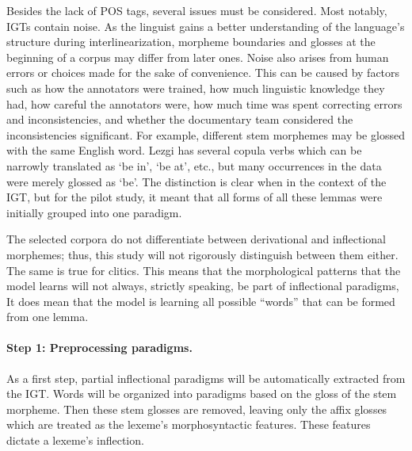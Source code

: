 Besides the lack of POS tags, several issues must be considered. Most notably, IGTs contain noise. 
As the linguist gains a better understanding of the language's structure during interlinearization, morpheme boundaries and glosses at the beginning of a corpus may differ from later ones. 
Noise also arises from human errors or choices made for the sake of convenience. This can be caused by factors such as how the annotators were trained, how much linguistic knowledge they had, how careful the annotators were, how much time was spent correcting errors and inconsistencies, and whether the documentary team considered the inconsistencies significant.
For example, different stem morphemes may be glossed with the same English word. Lezgi has several copula verbs which can be narrowly translated as `be in', `be at', etc., but many occurrences in the data were merely glossed as `be'. The distinction is clear when in the context of the IGT, but for the pilot study, it meant that all forms of all these lemmas were initially grouped into one paradigm.  
    
The selected corpora do not differentiate between derivational and inflectional morphemes; thus, this study will not rigorously distinguish between them either. The same is true for clitics. This means that the morphological patterns that the model learns will not always, strictly speaking, be part of inflectional paradigms, It does mean that the model is learning all possible ``words'' that can be formed from one lemma.

\paragraph{Step 1: Preprocessing paradigms.}
As a first step, partial inflectional paradigms will be automatically extracted from the IGT. Words will be organized into paradigms based on the gloss of the stem morpheme. Then these stem glosses are removed, leaving only the affix glosses which are treated as the lexeme's morphosyntactic features. These features dictate a lexeme's inflection.

